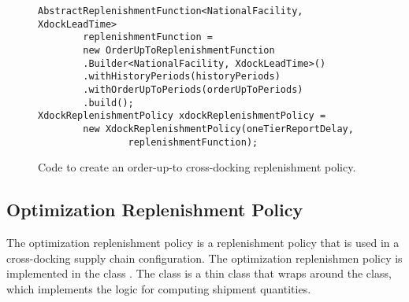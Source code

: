 \begin{figure}[h!]
\begin{lstlisting}
AbstractReplenishmentFunction<NationalFacility, XdockLeadTime> 
        replenishmentFunction =
        new OrderUpToReplenishmentFunction
        .Builder<NationalFacility, XdockLeadTime>()
        .withHistoryPeriods(historyPeriods)
        .withOrderUpToPeriods(orderUpToPeriods)
        .build();
XdockReplenishmentPolicy xdockReplenishmentPolicy =
        new XdockReplenishmentPolicy(oneTierReportDelay,
                replenishmentFunction);
\end{lstlisting}
\caption{Code to create an order-up-to cross-docking replenishment policy.}
\label{figure:zambia->computer-model->create-xdock-order-up-to-policies}
\end{figure}





\clearpage
\subsection{Optimization Replenishment Policy}

The optimization replenishment policy
is a replenishment policy
that is used in a cross-docking supply chain configuration.
The optimization replenishmen policy
is implemented in the class .
The class 
is a thin class that wraps around
the  class,
which implements the logic for computing shipment quantities.


